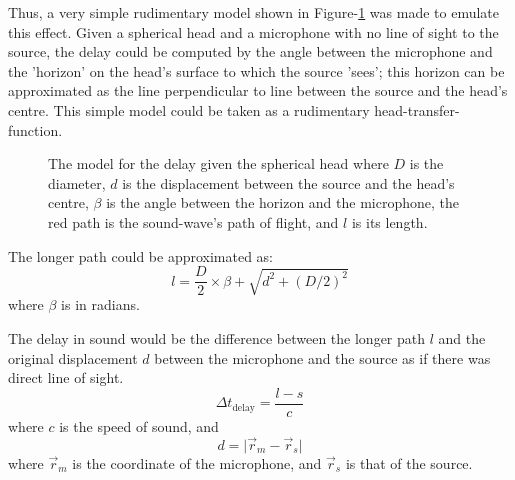\documentclass[notitlepage]{report}
\begin{document}
Thus, a very simple rudimentary model shown in Figure-\ref{fig:delay_model} was made to emulate this effect. Given a spherical head and a microphone with no line of sight to the source, the delay could be computed by the angle between the microphone and the 'horizon' on the head's surface to which the source 'sees'; this horizon can be approximated as the line perpendicular to line between the source and the head's centre. This simple model could be taken as a rudimentary head-transfer-function.

\begin{figure}[H]
\centering
\caption{The model for the delay given the spherical head where $D$ is the diameter, $d$ is the displacement between the source and the head's centre, $\beta$ is the angle between the horizon and the microphone, the red path is the sound-wave's path of flight, and $l$ is its length.}
\label{fig:delay_model}
\centering
\end{figure}

The longer path could be approximated as:
\begin{equation}
l = \frac{D}{2} \times \beta + \sqrt{d^2 + (D/2)^2}
\end{equation}
where $\beta$ is in radians.

The delay in sound would be the difference between the longer path $l$ and the original displacement $d$ between the microphone and the source as if there was direct line of sight.
\begin{equation}
\Delta t_{\text{delay}} = \frac{l-s}{c}
\end{equation}
where $c$ is the speed of sound, and
\begin{equation}
d = \lvert \vec{r}_m - \vec{r}_s \rvert
\end{equation}
where $\vec{r}_m$ is the coordinate of the microphone, and $\vec{r}_s$ is that of the source.
\end{document}
